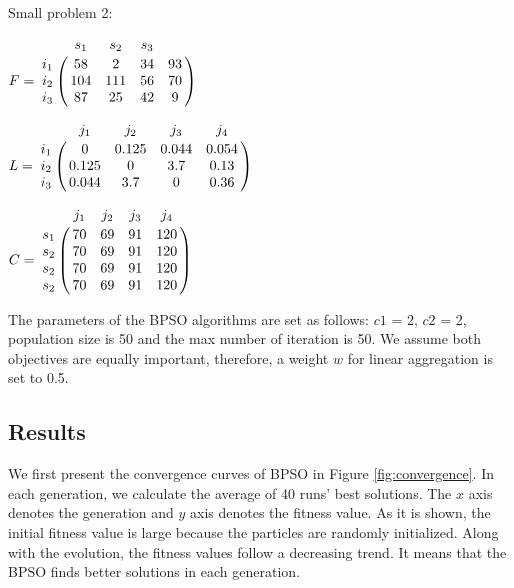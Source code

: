 Small problem 2:

\parbox{.5\linewidth}{

$
F = \bbordermatrix{~ & s_{1} & s_{2} & s_{3} \cr
					i_{1}	&58 &2 &34 &93	\cr
					i_{2}	&104 &111 &56 &70 \cr
					i_{3}	&87 &25 &42 &9 \cr}
$


}
\parbox{.5\linewidth}{

$
L = \bbordermatrix{~ & j_{1} & j_{2} & j_{3} & j_{4}\cr
					i_{1}	&0 &0.125 &0.044 &0.054	\cr
					i_{2}	&0.125  &0 &3.7 &0.13 \cr
					i_{3}	&0.044  &3.7 &0 &0.36 \cr}
$

}

$
C = \bbordermatrix{~ & j_{1} & j_{2} & j_{3} & j_{4}\cr
					s_{1}	&70  &69 &91 &120\cr
					s_{2}	&70  &69 &91 &120\cr
					s_{2}	&70  &69 &91 &120\cr
					s_{2}	&70  &69 &91 &120\cr}
$

The parameters of the BPSO algorithms are set as follows: $c1$ = 2, $c2$ = 2, population size is 50 and the max number of iteration is 50. 
We assume both objectives are equally important, therefore, a weight $w$ for linear aggregation is set to 0.5. 


\subsection{Results}
We first present the convergence curves of BPSO in Figure \ref{fig:convergence}. In each generation, we calculate the average of 40 runs' best solutions.
The $x$ axis denotes the 
generation and $y$ axis denotes the fitness value. As it is shown, the initial fitness value is large because 
the particles are randomly initialized.  Along with the evolution, the fitness values follow a decreasing trend. It means that the BPSO finds better solutions in each generation.


